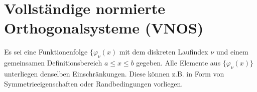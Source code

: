 \chapter{Vollständige normierte Orthogonalsysteme (VNOS)}
Es sei eine Funktionenfolge $\{\varphi_{\nu}(x)$ mit dem diskreten Laufindex
$\nu$ und einem gemeinsamen Definitionsbereich $a\le x\le b$ gegeben. Alle
Elemente aus $\{\varphi_{\nu}(x)\}$ unterliegen denselben Einschränkungen.
Diese können z.B. in Form von Symmetrieeigenschaften oder Randbedingungen
vorliegen.
